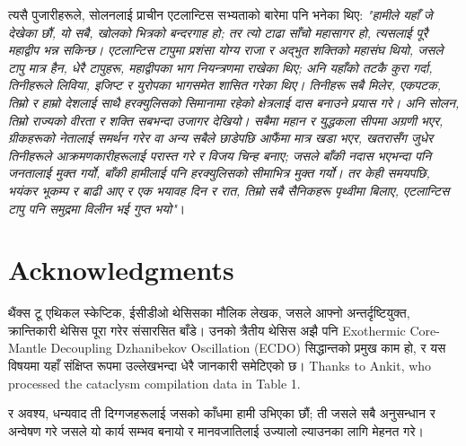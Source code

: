\documentclass[10pt,twocolumn,letterpaper]{article}
\begin{document}
त्यसै पुजारीहरूले, सोलनलाई प्राचीन एटलान्टिस सभ्यताको बारेमा पनि भनेका थिए: \textit{"हामीले यहाँ जे देखेका छौं, यो सबै, खोलको भित्रको बन्दरगाह हो; तर त्यो टाढा साँचो महासागर हो, त्यसलाई पूरै महाद्वीप भन्न सकिन्छ। एटलान्टिस टापुमा प्रशंसा योग्य राजा र अद्भुत शक्तिको महासंघ थियो, जसले टापु मात्र हैन, धेरै टापुहरू, महाद्वीपका भाग नियन्त्रणमा राखेका थिए; अनि यहाँको तटकै कुरा गर्दा, तिनीहरूले लिविया, इजिप्ट र युरोपका भागसमेत शासित गरेका थिए। तिनीहरू सबै मिलेर, एकपटक, तिम्रो र हाम्रो देशलाई साथै हरक्युलिसको सिमानामा रहेको क्षेत्रलाई दास बनाउने प्रयास गरे। अनि सोलन, तिम्रो राज्यको वीरता र शक्ति सबभन्दा उजागर देखियो। सबैमा महान र युद्धकला सीपमा अग्रणी भएर, ग्रीकहरूको नेतालाई समर्थन गरेर वा अन्य सबैले छाडेपछि आफैंमा मात्र खडा भएर, खतरासँग जुधेर तिनीहरूले आक्रमणकारीहरूलाई परास्त गरे र विजय चिन्ह बनाए; जसले बाँकी नदास भएभन्दा पनि जनतालाई मुक्त गर्यो, बाँकी हामीलाई पनि हरक्युलिसको सीमाभित्र मुक्त गर्यो। तर केही समयपछि, भयंकर भूकम्प र बाढी आए र एक भयावह दिन र रात, तिम्रो सबै सैनिकहरू पृथ्वीमा बिलाए, एटलान्टिस टापु पनि समुद्रमा विलीन भई गुप्त भयो"}।

\section{Acknowledgments}

थैंक्स टू एथिकल स्केप्टिक, ईसीडीओ थेसिसका मौलिक लेखक, जसले आफ्नो अन्तर्दृष्टियुक्त, क्रान्तिकारी थेसिस पूरा गरेर संसारसित बाँडे। उनको त्रैतीय थेसिस \cite{1} अझै पनि Exothermic Core-Mantle Decoupling Dzhanibekov Oscillation (ECDO) सिद्धान्तको प्रमुख काम हो, र यस विषयमा यहाँ संक्षिप्त रूपमा उल्लेखभन्दा धेरै जानकारी समेटिएको छ।
Thanks to Ankit, who processed the cataclysm compilation data in Table 1.

र अवश्य, धन्यवाद ती दिग्गजहरूलाई जसको काँधमा हामी उभिएका छौं; ती जसले सबै अनुसन्धान र अन्वेषण गरे जसले यो कार्य सम्भव बनायो र मानवजातिलाई उज्यालो ल्याउनका लागि मेहनत गरे।

\clearpage
\twocolumn
\end{document}
